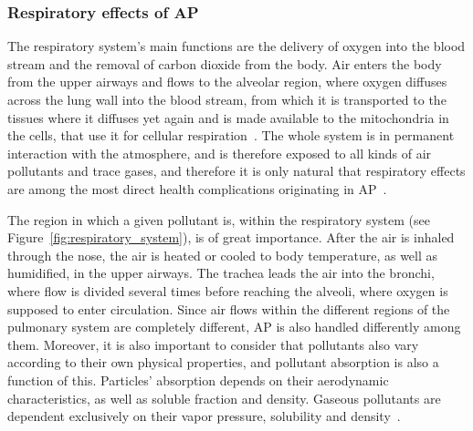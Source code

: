 

\subsubsection{Respiratory effects of \acrlong{AP}}%
\label{ssub:respiratory_system_ailments_related_to_ap}

The respiratory system's main functions are the delivery of oxygen into
the blood stream and the removal of carbon dioxide from the body. Air
enters the body from the upper airways and flows to the alveolar region,
where oxygen diffuses across the lung wall into the blood stream, from
which it is transported to the tissues where it diffuses yet again and
is made available to the mitochondria in the cells, that use it for
cellular respiration~\cite{Nilsson2010}. The whole system is in
permanent interaction with the atmosphere, and is therefore exposed to
all kinds of air pollutants and trace gases, and therefore it is only
natural that respiratory effects are among the most direct health
complications originating in \gls{AP}~\cite{Vallero2014}.

The region in which a given pollutant is, within the respiratory system
(see Figure~\ref{fig:respiratory_system}), is of great importance. After
the air is inhaled through the nose, the air is heated or cooled to body
temperature, as well as humidified, in the upper airways. The trachea
leads the air into the bronchi, where flow is divided several times
before reaching the alveoli, where oxygen is supposed to enter
circulation. Since air flows within the different regions of the
pulmonary system are completely different, \gls{AP} is also handled
differently among them. Moreover, it is also important to consider that
pollutants also vary according to their own physical properties, and
pollutant absorption is also a function of this.  Particles' absorption
depends on their aerodynamic characteristics, as well as soluble
fraction and density. Gaseous pollutants are dependent exclusively on
their vapor pressure, solubility and density~\cite{Nilsson2010,
Vallero2014}.

